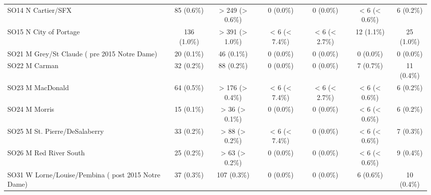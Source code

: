 \documentclass{article}
\begin{document}
\begin{table}[htbp]
\begin{longtable}{l*{6}{c}}
  SO14 N Cartier/SFX                                    &            85 (0.6\%)           &         > 249 (> 0.6\%)         &            0 (0.0\%)            &            0 (0.0\%)            &          < 6 (< 0.6\%)          &            6 (0.2\%)            \\
  SO15 N City of Portage                                &           136 (1.0\%)           &         > 391 (> 1.0\%)         &          < 6 (< 7.4\%)          &          < 6 (< 2.7\%)          &            12 (1.1\%)           &            25 (1.0\%)           \\
  SO21 M Grey/St Claude ( pre 2015 Notre Dame)          &            20 (0.1\%)           &            46 (0.1\%)           &            0 (0.0\%)            &            0 (0.0\%)            &            0 (0.0\%)            &            0 (0.0\%)            \\
  SO22 M Carman                                         &            32 (0.2\%)           &            88 (0.2\%)           &            0 (0.0\%)            &            0 (0.0\%)            &            7 (0.7\%)            &            11 (0.4\%)           \\
  SO23 M MacDonald                                      &            64 (0.5\%)           &         > 176 (> 0.4\%)         &          < 6 (< 7.4\%)          &          < 6 (< 2.7\%)          &          < 6 (< 0.6\%)          &            6 (0.2\%)            \\
  SO24 M Morris                                         &            15 (0.1\%)           &          > 36 (> 0.1\%)         &            0 (0.0\%)            &            0 (0.0\%)            &          < 6 (< 0.6\%)          &            6 (0.2\%)            \\
  SO25 M St. Pierre/DeSalaberry                         &            33 (0.2\%)           &          > 88 (> 0.2\%)         &          < 6 (< 7.4\%)          &            0 (0.0\%)            &          < 6 (< 0.6\%)          &            7 (0.3\%)            \\
  SO26 M Red River South                                &            25 (0.2\%)           &          > 63 (> 0.2\%)         &            0 (0.0\%)            &            0 (0.0\%)            &          < 6 (< 0.6\%)          &            9 (0.4\%)            \\
  SO31 W Lorne/Louise/Pembina ( post 2015 Notre Dame)   &            37 (0.3\%)           &           107 (0.3\%)           &            0 (0.0\%)            &            0 (0.0\%)            &            6 (0.6\%)            &            10 (0.4\%)           \\

\end{longtable}
\end{table}
\end{document}
